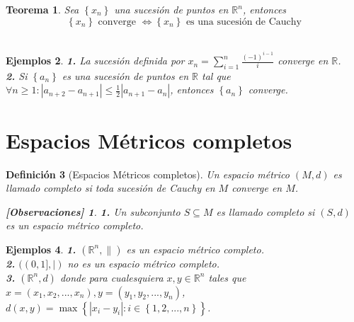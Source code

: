 \documentclass[oneside]{book} %
\theoremstyle{Teorema}
\newtheorem{Definicion}{Definición}[chapter]
\newtheorem{Teorema}[Definicion]{Teorema}
\theoremstyle{Ejemplos}
\newtheorem{Ejemplos}[Definicion]{Ejemplos}
\theoremstyle{[Obs]}
\newtheorem*{Obs}{[Observaciones]}
\newcommand{\abs}[1]{\left|#1\right|} %
\newcommand{\absSymbol}{\left|\right.} %
\newcommand{\normSymbol}{\lVert} %
\renewcommand{\{}{\left\lbrace} %
\renewcommand{\}}{\right\rbrace} %
\renewcommand{\sc}{\subseteq} %
\newcommand{\R}{\mathbb{R}} %
\newcommand{\Rn}{\mathbb{R}^n} %
\begin{document}
			\begin{Teorema}
				
				Sea $\{ x_n \}$ una sucesión de puntos en $\Rn$, entonces \\

				\[ \{ x_n \} \text{ converge } \Leftrightarrow \{ x_n \} \text{ es una sucesión de Cauchy} \] \\

			\end{Teorema}

			\begin{Ejemplos}
				
				\hfill

				\textbf{1.} La sucesión definida por $x_n = \displaystyle\sum_{i = 1}^{n} \frac{(-1)^{i - 1}}{i}$ converge en $\R$. \\

				\textbf{2.} Si $\{ a_n \}$ es una sucesión de puntos en $\R$ tal que $\forall n \geq 1 : \abs{ a_{n + 2} - a_{n + 1} } \leq \frac{1}{2}\abs{ a_{n + 1} - a_{n} }$, entonces $\{ a_n \}$ converge. \\

			\end{Ejemplos}
			
		\section{Espacios Métricos completos}

			\begin{Definicion}[Espacios Métricos completos]
				
				Un espacio métrico $(M, d)$ es llamado completo si toda sucesión de Cauchy en $M$ converge en $M$. \\

				\begin{Obs}
				
					\hfill
				
					\textbf{1.} Un subconjunto $S \sc M$ es llamado completo si $(S, d)$ es un espacio métrico completo. \\
				
				\end{Obs}

			\end{Definicion}

			\begin{Ejemplos}
				
				\hfill

				\textbf{1.} $(\Rn, \normSymbol)$ es un espacio métrico completo. \\

				\textbf{2.} $((0,1], \absSymbol)$ no es un espacio métrico completo. \\

				\textbf{3.} $(\Rn, d)$ donde para cualesquiera $x, y \in \Rn$ tales que $x = (x_1, x_2, ..., x_n), y = (y_1, y_2, ..., y_n)$, $d(x, y) = \max\{ \abs{ x_i - y_i} : i \in \{ 1, 2, ..., n \} \}$. \\

			\end{Ejemplos}
\end{document}
